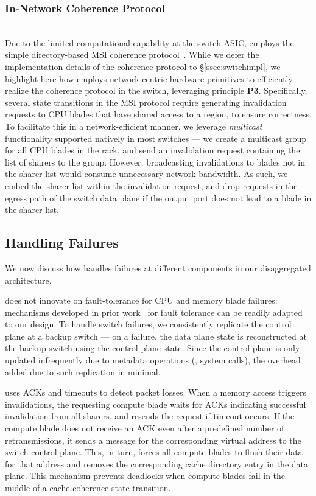 \subsubsection{In-Network Coherence Protocol}\label{subsec:cache_dir}\hfill\\
\noindent
Due to the limited computational capability at the switch ASIC, \mind employs the simple directory-based MSI coherence protocol~\cite{msi}. While we defer the implementation details of the coherence protocol to \S\ref{ssec:switchimpl}, we highlight here how \mind employs network-centric hardware primitives to efficiently realize the coherence protocol in the switch, leveraging principle \textbf{P3}. Specifically, several state transitions in the MSI protocol require generating invalidation requests to CPU blades that have shared access to a region, to ensure correctness. To facilitate this in a network-efficient manner, we leverage \textit{multicast} functionality supported natively in most switches --- we create a multicast group for all CPU blades in the rack, and send an invalidation request containing the list of sharers to the group. However, broadcasting invalidations to blades not in the sharer list would consume unnecessary network bandwidth. As such, we embed the sharer list within the invalidation request, and drop requests in the egress path of the switch data plane if the output port does not lead to a blade in the sharer list.

\subsection{Handling Failures}\label{subsec:acking}

We now discuss how \mind handles failures at different components in our disaggregated architecture.

 \mind does not innovate on fault-tolerance for CPU and memory blade failures: mechanisms developed in prior work~\cite{legoos, infiniswap, disaggfault} for fault tolerance can be readily adapted to our design. To handle switch failures, we consistently replicate the control plane at a backup switch --- on a failure, the data plane state is reconstructed at the backup switch using the control plane state. Since the control plane is only updated infrequently due to metadata operations (\eg, system calls), the overhead added due to such replication in minimal.

 \mind uses ACKs and timeouts to detect packet losses. When a memory access triggers invalidations, the requesting compute blade waits for ACKs indicating successful invalidation from all sharers, and resends the request if timeout occurs. If the compute blade does not receive an ACK even after a predefined number of retransmissions, it sends a  message for the corresponding virtual address to the switch control plane. This, in turn, forces all compute blades to flush their data for that address and removes the corresponding cache directory entry in the data plane. This  mechanism prevents deadlocks when compute blades fail in the middle of a cache coherence state transition.


